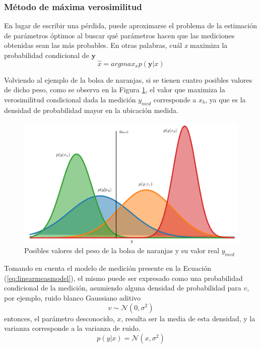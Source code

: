 \subsubsection{Método de máxima verosimilitud}

En lugar de escribir una pérdida, puede aproximarse el problema de la estimación de parámetros óptimos al buscar qué parámetros hacen que las mediciones obtenidas sean las más probables. En otras palabras, cuál \textit{x} maximiza la probabilidad condicional de $\bm{y}$
\begin{equation}
    \hat{x} = argmax_x p(\bm{y}|x)
\end{equation}

Volviendo al ejemplo de la bolsa de naranjas, si se tienen cuatro posibles valores de dicho peso, como se observa en la Figura \ref{fig:mostlikelyproba}, el valor que maximiza la verosimilitud condicional dada la medición $y_{med}$ corresponde a $x_b$, ya que es la densidad de probabilidad mayor en la ubicación medida.
\begin{figure}
    \centering
    \includegraphics[width=\textwidth]{Img/MostLikelyProba.png}
    \caption{Posibles valores del peso de la bolsa de naranjas y su valor real $y_{med}$}
    \label{fig:mostlikelyproba}
\end{figure}

Tomando en cuenta el modelo de medición presente en la Ecuación (\ref{eq:linearmeasmodel}), el mismo puede ser expresado como una probabilidad condicional de la medición, asumiendo alguna densidad de probabilidad para $v$, por ejemplo, ruido blanco Gaussiano aditivo
\begin{equation}
    v \sim \mathcal{N}(0,\sigma^2)
\end{equation}
entonces, el parámetro desconocido, $x$, resulta ser la media de esta densidad, y la varianza corresponde a la varianza de ruido.
\begin{equation}
    p(y|x) = \mathcal{N}(x,\sigma^2)
\end{equation}


